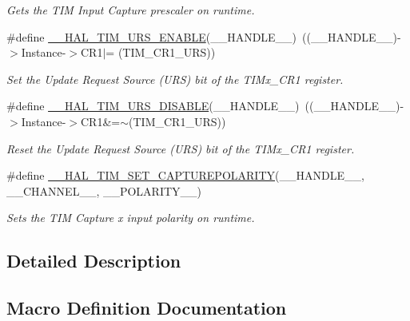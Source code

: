 \begin{DoxyCompactItemize}
\begin{DoxyCompactList}\small\item\em Gets the T\+IM Input Capture prescaler on runtime. \end{DoxyCompactList}\item 
\#define \hyperlink{group___t_i_m___exported___macros_ga3b06856bd6d7e10cfff342b1726db51d}{\+\_\+\+\_\+\+H\+A\+L\+\_\+\+T\+I\+M\+\_\+\+U\+R\+S\+\_\+\+E\+N\+A\+B\+LE}(\+\_\+\+\_\+\+H\+A\+N\+D\+L\+E\+\_\+\+\_\+)~((\+\_\+\+\_\+\+H\+A\+N\+D\+L\+E\+\_\+\+\_\+)-\/$>$Instance-\/$>$C\+R1$\vert$= (T\+I\+M\+\_\+\+C\+R1\+\_\+\+U\+RS))
\begin{DoxyCompactList}\small\item\em Set the Update Request Source (U\+RS) bit of the T\+I\+Mx\+\_\+\+C\+R1 register. \end{DoxyCompactList}\item 
\#define \hyperlink{group___t_i_m___exported___macros_gafacb551a4c537e62a0fe740b2f12236c}{\+\_\+\+\_\+\+H\+A\+L\+\_\+\+T\+I\+M\+\_\+\+U\+R\+S\+\_\+\+D\+I\+S\+A\+B\+LE}(\+\_\+\+\_\+\+H\+A\+N\+D\+L\+E\+\_\+\+\_\+)~((\+\_\+\+\_\+\+H\+A\+N\+D\+L\+E\+\_\+\+\_\+)-\/$>$Instance-\/$>$C\+R1\&=$\sim$(T\+I\+M\+\_\+\+C\+R1\+\_\+\+U\+RS))
\begin{DoxyCompactList}\small\item\em Reset the Update Request Source (U\+RS) bit of the T\+I\+Mx\+\_\+\+C\+R1 register. \end{DoxyCompactList}\item 
\#define \hyperlink{group___t_i_m___exported___macros_gac5d6989516caa67fae23a9329228cdc7}{\+\_\+\+\_\+\+H\+A\+L\+\_\+\+T\+I\+M\+\_\+\+S\+E\+T\+\_\+\+C\+A\+P\+T\+U\+R\+E\+P\+O\+L\+A\+R\+I\+TY}(\+\_\+\+\_\+\+H\+A\+N\+D\+L\+E\+\_\+\+\_\+,  \+\_\+\+\_\+\+C\+H\+A\+N\+N\+E\+L\+\_\+\+\_\+,  \+\_\+\+\_\+\+P\+O\+L\+A\+R\+I\+T\+Y\+\_\+\+\_\+)
\begin{DoxyCompactList}\small\item\em Sets the T\+IM Capture x input polarity on runtime. \end{DoxyCompactList}\end{DoxyCompactItemize}


\subsection{Detailed Description}


\subsection{Macro Definition Documentation}
\mbox{\label{group___t_i_m___exported___macros_ga2fe74db6b8cb4badd04ed48e0f5ac7b4}} 
